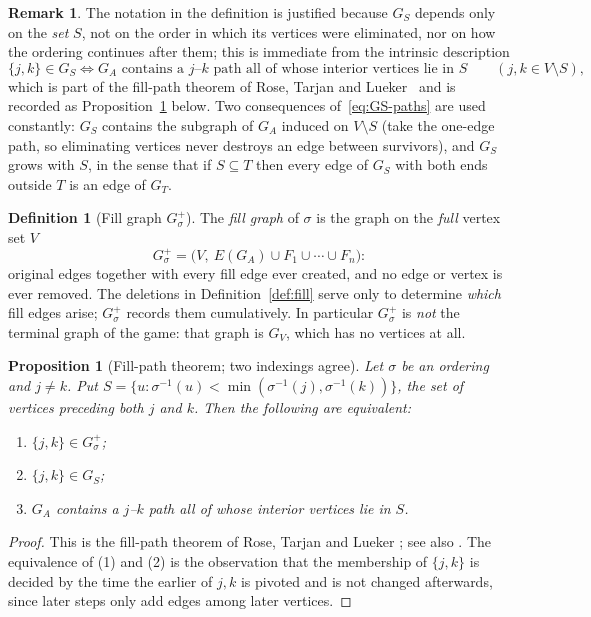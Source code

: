 \documentclass[11pt]{article}
\theoremstyle{plain}
\newtheorem{proposition}[theorem]{Proposition}
\theoremstyle{definition}
\newtheorem{definition}[theorem]{Definition}
\newtheorem{remark}[theorem]{Remark}
\begin{document}
\begin{humanblock}
\begin{remark}
    The notation in the definition is justified because $G_S$ depends only on the \emph{set} $S$, not on the order in which
its vertices were eliminated, nor on how the ordering continues after them; this is immediate from the
intrinsic description
\begin{equation}\label{eq:GS-paths}
  \{j,k\}\in G_S \iff \text{$G_A$ contains a $j$--$k$ path all of whose interior vertices lie in $S$}
  \qquad (j,k\in V\setminus S),
\end{equation}
which is part of the fill-path theorem of Rose, Tarjan and Lueker~\cite{Rose} and is recorded as
Proposition~\ref{prop:fillpath} below. Two consequences of~\eqref{eq:GS-paths} are used constantly:
$G_S$ contains the subgraph of $G_A$ induced on $V\setminus S$ (take the one-edge path, so eliminating
vertices never destroys an edge between survivors), and $G_S$ grows with $S$, in the sense that if
$S\subseteq T$ then every edge of $G_S$ with both ends outside $T$ is an edge of $G_T$.
\end{remark}

\begin{definition}[Fill graph $G^+_\sigma$]\label{def:fillgraph}
The \emph{fill graph} of $\sigma$ is the graph on the \emph{full} vertex set $V$
\[
G^+_\sigma=\bigl(V,\ E(G_A)\cup F_1\cup\cdots\cup F_n\bigr):
\]
original edges together with every fill edge ever created, and no edge or vertex is ever removed.
The deletions in Definition~\ref{def:fill} serve only to determine \emph{which} fill edges arise;
$G^+_\sigma$ records them cumulatively. In particular $G^+_\sigma$ is \emph{not} the terminal graph of
the game: that graph is $G_V$, which has no vertices at all.
\end{definition}

\begin{proposition}[Fill-path theorem; two indexings agree]\label{prop:fillpath}
Let $\sigma$ be an ordering and $j\neq k$. Put
$S=\{u:\sigma^{-1}(u)<\min(\sigma^{-1}(j),\sigma^{-1}(k))\}$, the set of vertices preceding both $j$
and $k$. Then the following are equivalent:
\begin{enumerate}
\item $\{j,k\}\in G^+_\sigma$;
\item $\{j,k\}\in G_S$;
\item $G_A$ contains a $j$--$k$ path all of whose interior vertices lie in $S$.
\end{enumerate}
\end{proposition}
\begin{proof}
This is the fill-path theorem of Rose, Tarjan and Lueker \cite{Rose}; see also \cite{Fulkerson}. The
equivalence of (1) and (2) is the observation that the membership of $\{j,k\}$ is decided by the time
the earlier of $j,k$ is pivoted and is not changed afterwards, since later steps only add edges among
later vertices.
\end{proof}


\end{humanblock}
\end{document}
